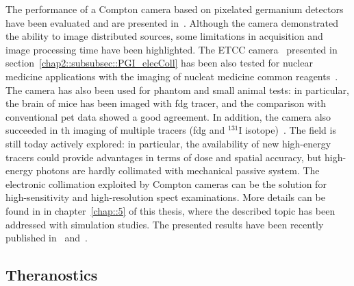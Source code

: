 The performance of a Compton camera based on pixelated germanium detectors have been evaluated and are presented in~\parencite{Alnaaimi2011}. Although the camera demonstrated the ability to image distributed sources, some limitations in acquisition and image processing time have been highlighted. 
The ETCC camera~\parencite{Kabuki2007} presented in section~\ref{chap2::subsubsec::PGI_elecColl} has been also tested for nuclear medicine applications with the imaging of nucleat medicine common reagents~\parencite{Kabuki2009}. The camera has also been used for phantom and small animal tests: in particular, the brain of mice has been imaged with \gls{fdg} tracer, and the comparison with conventional \gls{pet} data showed a good agreement. In addition, the camera also succeeded in th imaging of multiple tracers (\gls{fdg} and $^{131}$I isotope)~\parencite{Kabuki2010}.
The field is still today actively explored: in particular, the availability of new high-energy tracers could provide advantages in terms of dose and spatial accuracy, but high-energy photons are hardly collimated with mechanical passive system. The electronic collimation exploited by Compton cameras can be the solution for high-sensitivity and high-resolution \gls{spect} examinations. 
More details can be found in in chapter~\ref{chap::5} of this thesis, where the described topic has been addressed with simulation studies. The presented results have been recently published in~\parencite{Fontana2017_PMB} and~\parencite{Fontana2017_APPB}. 

\subsection{Theranostics}\label{chap2::subsec::Theranostics}

